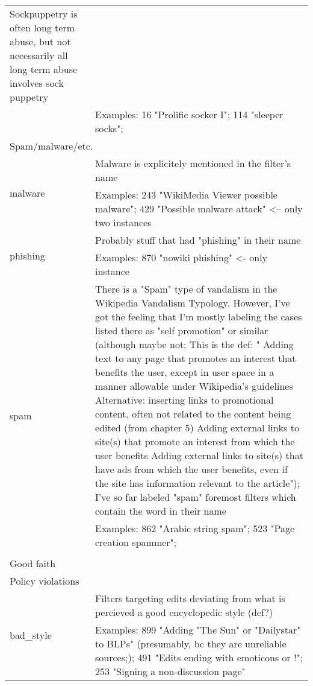 \begin{longtable}{ | p{5cm} | p{9cm} | }
  Sockpuppetry is often long term abuse, but not necessarily all long term abuse involves sock puppetry \\
                                     & Examples: 16 "Prolific socker I"; 114 "sleeper socks";\\
    \hline
        \multicolumn{2}{|l|}{Spam/malware/etc.} \\
    \hline
    \multirow{2}{*}{malware} & Malware is explicitely mentioned in the filter's name \\%
                                     & Examples: 243 "WikiMedia Viewer possible malware"; 429 "Possible malware attack" <-- only two instances\\
    \hline
    \multirow{2}{*}{phishing} & Probably stuff that had "phishing" in their name\\
                                     & Examples: 870 "nowiki phishing" <- only instance\\
    \hline
    \multirow{2}{*}{spam} & There is a "Spam" type of vandalism in the Wikipedia Vandalism Typology. However, I've got the feeling that I'm mostly labeling the cases listed there as "self promotion" or similar (although maybe not; This is the def: "    Adding text to any page that promotes an interest that benefits the user, except in user space in a manner allowable under Wikipedia's guidelines
  Alternative: inserting links to promotional content, often not related to the content being edited (from chapter 5)
    Adding external links to site(s) that promote an interest from which the user benefits
    Adding external links to site(s) that have ads from which the user benefits, even if the site has information relevant to the article");
  I've so far labeled "spam" foremost filters which contain the word in their name\\
                                     & Examples: 862 "Arabic string spam";  523 "Page creation spammer";\\
    \hline
        \multicolumn{2}{|l|}{} \\
    \hline
        \multicolumn{2}{|l|}{Good faith} \\
    \hline
        \multicolumn{2}{|l|}{Policy violations} \\
    \hline
    \multirow{2}{*}{bad\_style} & Filters targeting edits deviating from what is percieved a good encyclopedic style (def?)\\
                                     & Examples: 899 "Adding "The Sun" or "Dailystar" to BLPs" (presumably, bc they are unreliable sources;); 491 "Edits ending with emoticons or !"; 253 "Signing a non-discussion page"\\

\end{longtable}
